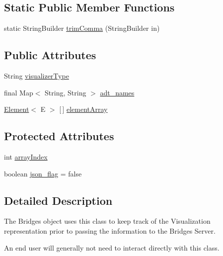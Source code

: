 \subsection*{Static Public Member Functions}
\begin{DoxyCompactItemize}
\item 
static String\+Builder \hyperlink{classbridges_1_1base_1_1_a_d_t_visualizer_af9ce115911ca745c6710b6faddfc0650}{trim\+Comma} (String\+Builder in)
\end{DoxyCompactItemize}
\subsection*{Public Attributes}
\begin{DoxyCompactItemize}
\item 
String \hyperlink{classbridges_1_1base_1_1_a_d_t_visualizer_a288aece657b5641f48e839b34f3884b9}{visualizer\+Type}
\item 
final Map$<$ String, String $>$ \hyperlink{classbridges_1_1base_1_1_a_d_t_visualizer_a6646d020143637569d607fa109c71ff9}{adt\+\_\+names}
\item 
\hyperlink{classbridges_1_1base_1_1_element}{Element}$<$ E $>$ \mbox{[}$\,$\mbox{]} \hyperlink{classbridges_1_1base_1_1_a_d_t_visualizer_a320739b4be463d3987b3de2463b0d592}{element\+Array}
\end{DoxyCompactItemize}
\subsection*{Protected Attributes}
\begin{DoxyCompactItemize}
\item 
int \hyperlink{classbridges_1_1base_1_1_a_d_t_visualizer_a6304c4131e3e7eb5953402368b0e9e3c}{array\+Index}
\item 
boolean \hyperlink{classbridges_1_1base_1_1_a_d_t_visualizer_abf75be63a37f31ada7f92a84bb1bc536}{json\+\_\+flag} = false
\end{DoxyCompactItemize}


\subsection{Detailed Description}
The Bridges object uses this class to keep track of the Visualization representation prior to passing the information to the Bridges Server. 

An end user will generally not need to interact directly with this class. 

